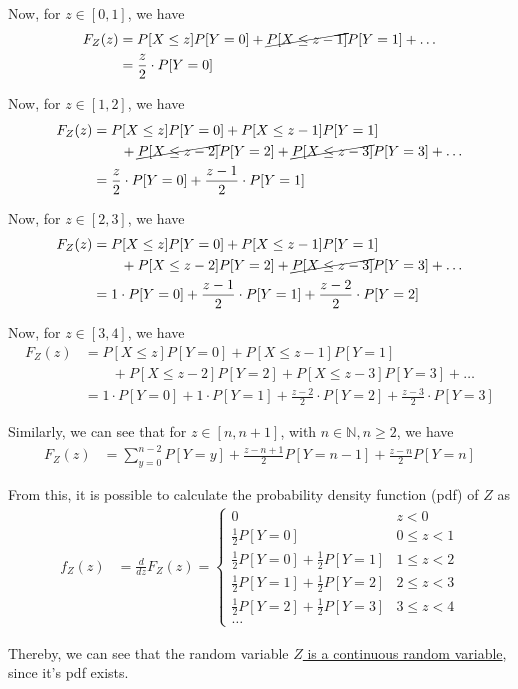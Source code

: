 Now, for \( z \in [0, 1] \), we have
\begin{align*}
    F_{Z}(z)
     & =
    P[X \leq z] P[Y = 0]
    +
    \cancel{P[X \leq z-1]} P[Y = 1]
    +
    \ldots
    \\ & =
    \frac{z}{2} \cdot P[Y = 0]
\end{align*}

Now, for \( z \in [1, 2] \), we have
\begin{align*}
    F_{Z}(z)
     & =
    P[X \leq z] P[Y = 0]
    +
    P[X \leq z-1] P[Y = 1]
    \\ & \qquad +
    \cancel{P[X \leq z-2]} P[Y = 2]
    +
    \cancel{P[X \leq z-3]} P[Y = 3]
    +
    \ldots
    \\ & =
    \frac{z}{2} \cdot P[Y = 0]
    +
    \frac{z-1}{2} \cdot P[Y = 1]
\end{align*}

Now, for \( z \in [2, 3] \), we have
\begin{align*}
    F_{Z}(z)
     & =
    P[X \leq z] P[Y = 0]
    +
    P[X \leq z-1] P[Y = 1]
    \\ & \qquad +
    P[X \leq z-2] P[Y = 2]
    +
    \cancel{P[X \leq z-3]} P[Y = 3]
    +
    \ldots
    \\ & =
    1 \cdot P[Y = 0]
    +
    \frac{z-1}{2} \cdot P[Y = 1]
    +
    \frac{z-2}{2} \cdot P[Y = 2]
\end{align*}

Now, for \( z \in [3, 4] \), we have
\begin{align*}
    F_{Z}(z)
     & =
    P[X \leq z] P[Y = 0]
    +
    P[X \leq z-1] P[Y = 1]
    \\ & \qquad +
    P[X \leq z-2] P[Y = 2]
    +
    P[X \leq z-3] P[Y = 3]
    +
    \ldots
    \\ & =
    1 \cdot P[Y = 0]
    +
    1 \cdot P[Y = 1]
    +
    \frac{z-2}{2} \cdot P[Y = 2]
    +
    \frac{z-3}{2} \cdot P[Y = 3]
\end{align*}

Similarly, we can see that for \( z \in [n, n+1] \), with \( n \in \mathbb{N}, n \geq 2 \), we have
\begin{align*}
    F_{Z}(z)
     & =
    \sum_{y=0}^{n-2} P[Y = y]
    +
    \frac{z-n+1}{2} P[Y = n-1]
    +
    \frac{z-n}{2} P[Y = n]
\end{align*}

From this, it is possible to calculate the probability density function (pdf) of \( Z \) as
\begin{align*}
    f_{Z}(z)
     & =
    \frac{d}{dz} F_{Z}(z)
    =
    \begin{cases}
        0                                           & z < 0        \\
        \frac{1}{2} P[Y = 0]                        & 0 \leq z < 1 \\
        \frac{1}{2} P[Y = 0] + \frac{1}{2} P[Y = 1] & 1 \leq z < 2 \\
        \frac{1}{2} P[Y = 1] + \frac{1}{2} P[Y = 2] & 2 \leq z < 3 \\
        \frac{1}{2} P[Y = 2] + \frac{1}{2} P[Y = 3] & 3 \leq z < 4 \\
        \ldots
    \end{cases}
\end{align*}

Thereby, we can see that the random variable \underline{\( Z \) is a continuous random variable}, since it's pdf exists.
